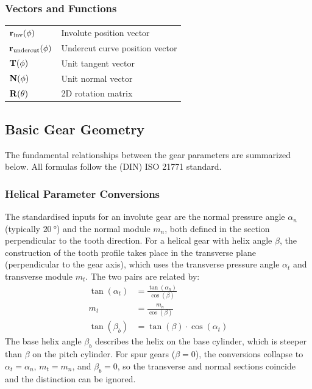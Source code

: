 \subsubsection*{Vectors and Functions}
\begin{tabular}{@{}ll@{}}
    $\vb{r}_{\text{inv}}(\phi)$         & Involute position vector \\
    $\vb{r}_{\text{undercut}}(\phi)$    & Undercut curve position vector \\
    $\vb{T}(\phi)$                      & Unit tangent vector \\
    $\vb{N}(\phi)$                      & Unit normal vector \\
    $\vb{R}(\theta)$                    & 2D rotation matrix \\
\end{tabular}

\subsection{Basic Gear Geometry}

The fundamental relationships between the gear parameters are summarized below. All formulas follow the (DIN) ISO 21771 standard.

\subsubsection*{Helical Parameter Conversions}
\label{subsec:helical_conversions}
The standardised inputs for an involute gear are the normal pressure angle $\alpha_n$ (typically $\SI{20}{\degree}$) and the normal module $m_n$, both defined in the section perpendicular to the tooth direction. For a helical gear with helix angle $\beta$, the construction of the tooth profile takes place in the transverse plane (perpendicular to the gear axis), which uses the transverse pressure angle $\alpha_t$ and transverse module $m_t$. The two pairs are related by:
\begin{align}
    \tan(\alpha_t) &= \frac{\tan(\alpha_n)}{\cos(\beta)} \\
    m_t &= \frac{m_n}{\cos(\beta)} \\
    \tan(\beta_b) &= \tan(\beta) \cdot \cos(\alpha_t)
\end{align}
The base helix angle $\beta_b$ describes the helix on the base cylinder, which is steeper than $\beta$ on the pitch cylinder. For spur gears ($\beta = 0$), the conversions collapse to $\alpha_t = \alpha_n$, $m_t = m_n$, and $\beta_b = 0$, so the transverse and normal sections coincide and the distinction can be ignored.

